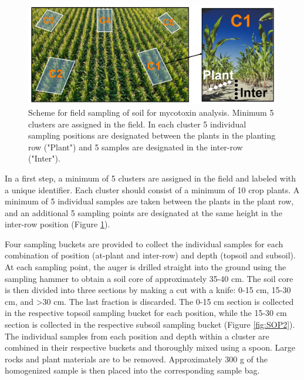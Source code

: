\begin{refsection}
\begin{figure}[b!]
\centering
\includegraphics[width=1\textwidth]{figures/sop_soil sampling 1.jpg}
\decoRule
\captionsetup{labelfont=bf, justification=justified, singlelinecheck=false, width=1\textwidth} 
\caption{Scheme for field sampling of soil for mycotoxin analysis. Minimum 5 clusters are assigned in the field. In each cluster 5 individual sampling positions are designated between the plants in the planting row ("Plant") and 5 samples are designated in the inter-row ("Inter").}
\label{fig:SOP1}
\end{figure}

In a first step, a minimum of 5 clusters are assigned in the field and labeled with a unique identifier. Each cluster should consist of a minimum of 10 crop plants. A minimum of 5 individual samples are taken between the plants in the plant row, and an additional 5 sampling points are designated at the same height in the inter-row position (Figure \ref{fig:SOP1}).


Four sampling buckets are provided to collect the individual samples for each combination of position (at-plant and inter-row) and depth (topsoil and subsoil). At each sampling point, the auger is drilled straight into the ground using the sampling hammer to obtain a soil core of approximately 35-40 cm. The soil core is then divided into three sections by making a cut with a knife: 0-15 cm, 15-30 cm, and >30 cm. The last fraction is discarded. The 0-15 cm section is collected in the respective topsoil sampling bucket for each position, while the 15-30 cm section is collected in the respective subsoil sampling bucket (Figure \ref{fig:SOP2}). The individual samples from each position and depth within a cluster are combined in their respective buckets and thoroughly mixed using a spoon. Large rocks and plant materials are to be removed. Approximately 300 g of the homogenized sample is then placed into the corresponding sample bag.


\end{refsection}
